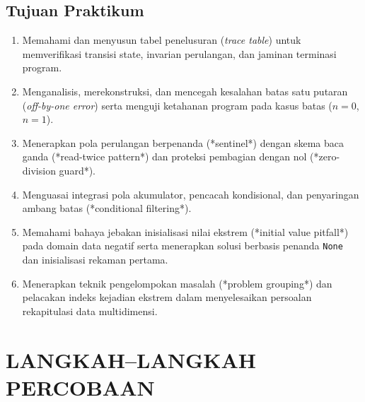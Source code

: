 \documentclass[12pt,a4paper]{article}
\begin{document}
\subsection{Tujuan Praktikum}
\begin{enumerate}
    \item Memahami dan menyusun tabel penelusuran (\textit{trace table}) untuk memverifikasi transisi state, invarian perulangan, dan jaminan terminasi program.
    \item Menganalisis, merekonstruksi, dan mencegah kesalahan batas satu putaran (\textit{off-by-one error}) serta menguji ketahanan program pada kasus batas ($n=0$, $n=1$).
    \item Menerapkan pola perulangan berpenanda (*sentinel*) dengan skema baca ganda (*read-twice pattern*) dan proteksi pembagian dengan nol (*zero-division guard*).
    \item Menguasai integrasi pola akumulator, pencacah kondisional, dan penyaringan ambang batas (*conditional filtering*).
    \item Memahami bahaya jebakan inisialisasi nilai ekstrem (*initial value pitfall*) pada domain data negatif serta menerapkan solusi berbasis penanda \texttt{None} dan inisialisasi rekaman pertama.
    \item Menerapkan teknik pengelompokan masalah (*problem grouping*) dan pelacakan indeks kejadian ekstrem dalam menyelesaikan persoalan rekapitulasi data multidimensi.
\end{enumerate}

\section{LANGKAH--LANGKAH PERCOBAAN}
\end{document}
